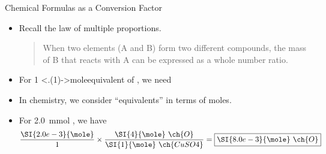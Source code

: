 \documentclass[notes=onlyslideswithnotes,notes=hide]{beamer}
\begin{document}
\begin{frame}{Chemical Formulas as a Conversion Factor}
	\begin{itemize}[<+->]
		\item Recall the law of multiple proportions.
			\smallskip
			\begin{quote}
						When two elements (A and B) form two different compounds,
						the mass of B that reacts with A can be
						expressed as a \alert{whole number ratio}.
			\end{quote}
		\item For 1 \alt<.(1)->{mole}{equivalent} of , we need
		\item In chemistry, we consider ``equivalents'' in terms of \alert{moles}.
		\item For \SI{2.0}{\milli\mole} , we have
			\begin{align*}
				\frac{\SI{2.0e-3}{\mole}}{1} \times
				\frac{\SI{4}{\mole}~\ch{O}}{\SI{1}{\mole}~\ch{CuSO4}}
				= \boxed{\SI{8.0e-3}{\mole}~\ch{O}} 
			\end{align*}
	\end{itemize}
\end{frame}
\end{document}
